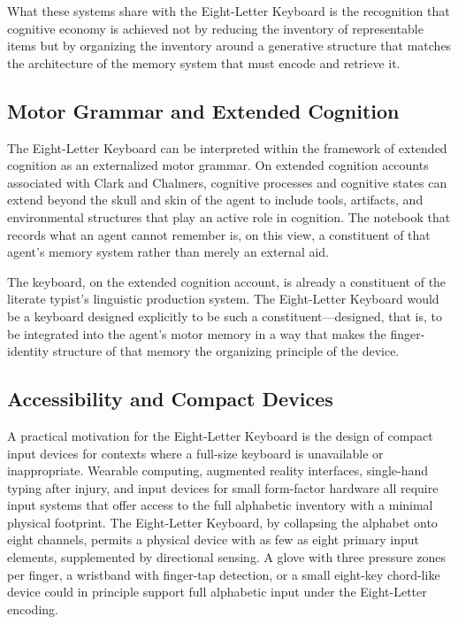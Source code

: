 \documentclass[12pt,a4paper]{article}
\theoremstyle{plain}
\theoremstyle{definition}
\theoremstyle{remark}
\begin{document}
What these systems share with the Eight-Letter Keyboard is the recognition that
cognitive economy is achieved not by reducing the inventory of representable
items but by organizing the inventory around a generative structure that matches
the architecture of the memory system that must encode and retrieve it.

\subsection{Motor Grammar and Extended Cognition}

The Eight-Letter Keyboard can be interpreted within the framework of extended
cognition as an externalized motor grammar. On extended cognition accounts
associated with Clark and Chalmers, cognitive processes and cognitive states can
extend beyond the skull and skin of the agent to include tools, artifacts, and
environmental structures that play an active role in cognition. The notebook that
records what an agent cannot remember is, on this view, a constituent of that
agent's memory system rather than merely an external aid.

The keyboard, on the extended cognition account, is already a constituent of the
literate typist's linguistic production system. The Eight-Letter Keyboard would
be a keyboard designed explicitly to be such a constituent---designed, that is,
to be integrated into the agent's motor memory in a way that makes the
finger-identity structure of that memory the organizing principle of the device.

\subsection{Accessibility and Compact Devices}

A practical motivation for the Eight-Letter Keyboard is the design of compact
input devices for contexts where a full-size keyboard is unavailable or
inappropriate. Wearable computing, augmented reality interfaces, single-hand
typing after injury, and input devices for small form-factor hardware all require
input systems that offer access to the full alphabetic inventory with a minimal
physical footprint. The Eight-Letter Keyboard, by collapsing the alphabet onto
eight channels, permits a physical device with as few as eight primary input
elements, supplemented by directional sensing. A glove with three pressure zones
per finger, a wristband with finger-tap detection, or a small eight-key
chord-like device could in principle support full alphabetic input under the
Eight-Letter encoding.
\end{document}
